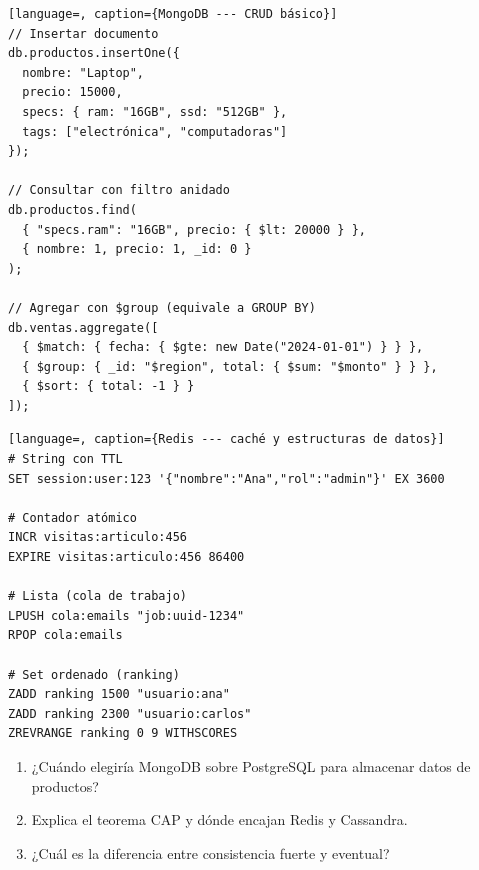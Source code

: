 \begin{lstlisting}[language=, caption={MongoDB --- CRUD básico}]
// Insertar documento
db.productos.insertOne({
  nombre: "Laptop",
  precio: 15000,
  specs: { ram: "16GB", ssd: "512GB" },
  tags: ["electrónica", "computadoras"]
});

// Consultar con filtro anidado
db.productos.find(
  { "specs.ram": "16GB", precio: { $lt: 20000 } },
  { nombre: 1, precio: 1, _id: 0 }
);

// Agregar con $group (equivale a GROUP BY)
db.ventas.aggregate([
  { $match: { fecha: { $gte: new Date("2024-01-01") } } },
  { $group: { _id: "$region", total: { $sum: "$monto" } } },
  { $sort: { total: -1 } }
]);
\end{lstlisting}

\begin{lstlisting}[language=, caption={Redis --- caché y estructuras de datos}]
# String con TTL
SET session:user:123 '{"nombre":"Ana","rol":"admin"}' EX 3600

# Contador atómico
INCR visitas:articulo:456
EXPIRE visitas:articulo:456 86400

# Lista (cola de trabajo)
LPUSH cola:emails "job:uuid-1234"
RPOP cola:emails

# Set ordenado (ranking)
ZADD ranking 1500 "usuario:ana"
ZADD ranking 2300 "usuario:carlos"
ZREVRANGE ranking 0 9 WITHSCORES
\end{lstlisting}

\begin{entrevistabox}
\begin{enumerate}
  \item ¿Cuándo elegiría MongoDB sobre PostgreSQL para almacenar datos de productos?
  \item Explica el teorema CAP y dónde encajan Redis y Cassandra.
  \item ¿Cuál es la diferencia entre consistencia fuerte y eventual?
\end{enumerate}
\end{entrevistabox}
